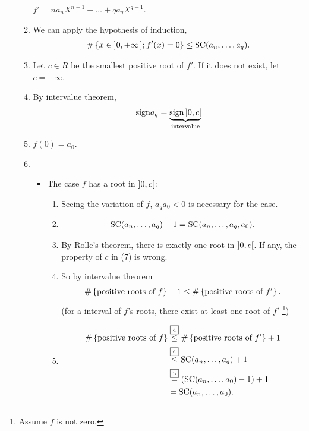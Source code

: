 \documentclass[9pt]{ltjsarticle}
\begin{document}
\begin{itemize}
\begin{enumerate}
    $f'=na_n X^{n-1} + \dots + qa_q X^{q-1}$.
    \item
    We can apply the hypothesis of induction,
    \begin{align}
      \#\left\{x\in \left] 0,+\infty \right[; f'(x)=0\right\} \le \mathrm{SC}(a_n,\dots, a_q).
    \end{align}
    \item
    Let $c \in R$ be the smallest positive root of $f'$.
    If it does not exist, let $c = +\infty$.
    \item
    By intervalue theorem,
    \begin{align}
      \mathrm{sign} a_q = \underbrace{ \mathrm{sign} \left] 0,c \right[}_{\text{intervalue}}
    \end{align}
    \item
    $f(0) = a_0$.
    \item
    \begin{itemize}
      \item The case $f$ has a root in $\left] 0,c \right[$:
        \begin{enumerate}
          \item Seeing the variation of $f$,
          $a_q a_0 < 0$ is necessary for the case.
          \item
          \begin{align}
            \mathrm{SC}(a_n,\dots,a_q) + 1 = \mathrm{SC}(a_n,\dots,a_q,a_0).
          \end{align}
          \item
          By Rolle's theorem, there is exactly one root in $\left] 0,c \right[$.
          \pf If any, the property of $c$ in (7) is wrong.
          \item
          So by intervalue theorem
          \begin{align}
            \# \left\{\text{positive roots of $f$}\right\} -1 \le \# \left\{\text{positive roots of $f'$}\right\}.
          \end{align}
          (for a interval of $f$'s roots, there exist at least one root of $f'$ \footnote{Assume $f$ is not zero.})
          \item
          \begin{align}
            \# \set{\text{positive roots of $f$}}
            &\descle{d}
            \# \set{\text{positive roots of $f'$}} + 1\\
            &\descle{6}
            \SC(a_n,\dots,a_q) + 1\\
            &\desceq{b}
            (\SC(a_n,\dots,a_0)-1) + 1\\
            &=
            \SC(a_n,\dots,a_0).

\end{align}
\end{enumerate}
\end{itemize}
\end{enumerate}
\end{itemize}
\end{document}
